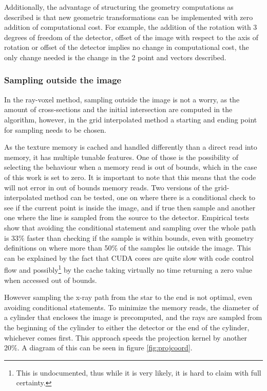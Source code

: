 Additionally, the advantage of structuring the geometry computations as described is that new geometric transformations can be implemented with zero addition of computational cost. For example, the addition of the rotation with 3 degrees of freedom of the detector, offset of the image with respect to the axis of rotation or offset of the detector implies no change in computational cost, the only change needed is the change in the 2 point and vectors described.
 
\subsubsection{Sampling outside the image}

In the ray-voxel method, sampling outside the image is not a worry, as the amount of cross-sections and the initial intersection are computed in the algorithm, however, in the grid interpolated method a starting and ending point for sampling needs to be chosen. 

As the texture memory is cached and handled differently than a direct read into memory, it has multiple tunable features. One of those is the possibility of selecting the behaviour when a memory read is out of bounds, which in the case of this work is set to zero. It is important to note that this means that the code will not error in out of bounds memory reads. Two versions of the grid-interpolated method can be tested, one on where there is a conditional check to see if the current point is inside the image, and if true then sample and another one where the line is sampled from the source to the detector. Empirical tests show that avoiding the conditional statement and sampling over the whole path is 33\% faster than checking if the sample is within bounds, even with geometry definitions on where more than 50\% of the samples lie outside the image. This can be explained by the fact that CUDA cores are quite slow with code control flow and possibly\footnote{This is undocumented, thus while it is very likely, it is hard to claim with full certainty.} by the cache taking virtually no time returning a zero value when accessed out of bounds. 

However sampling the x-ray path from the star to the end is not optimal, even avoiding conditional statements. To minimize the memory reads, the diameter of a cylinder that encloses the image is precomputed, and the rays are sampled from the beginning of the cylinder to either the detector or the end of the cylinder, whichever comes first. This approach speeds the projection kernel by another 20\%. A diagram of this can be seen in figure \ref{fig:projcoord}.

